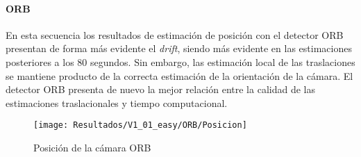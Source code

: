 \paragraph {ORB}

En esta secuencia los resultados de estimación de posición con el detector ORB presentan de forma más evidente el \textit{drift}, siendo más evidente en las estimaciones posteriores a los 80 segundos. Sin embargo, las estimación local de las traslaciones se mantiene producto de la correcta estimación de la orientación de la cámara. El detector ORB presenta de nuevo la mejor relación entre la calidad de las estimaciones traslacionales y tiempo computacional.

\begin{figure}[H]
	\centering
	\texttt{[image: Resultados/V1\_01\_easy/ORB/Posicion]}
	\caption{Posición de la cámara ORB}
	\label{imagen:Resultados/V1_01_easy/ORB/Posicion}
\end{figure}



%
%
%
%
%
%
%
%

